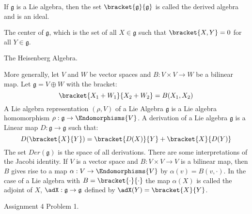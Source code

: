 \documentclass{book}                                                           %
\begin{document}
                \begin{example}
                    If $\mathfrak{g}$ is a Lie algebra, then the set
                    $\bracket{\mathfrak{g}}{\mathfrak{g}}$ is called the derived
                    algebra and is an ideal.
                \end{example}
                \begin{example}
                    The center of $\mathfrak{g}$, which is the set of all
                    $X\in\mathfrak{g}$ such that $\bracket{X,Y}=0$ for all
                    $Y\in\mathfrak{g}$.
                \end{example}
                \begin{example}
                    The Heisenberg Algebra.
                \end{example}
                More generally, let $V$ and $W$ be vector spaces and
                $B:V\times{V}\rightarrow{W}$ be a bilinear map. Let
                $\mathfrak{g}=V\oplus{W}$ with the bracket:
                \begin{equation}
                    \bracket{X_{1}+W_{1}}{X_{2}+W_{2}}=B(X_{1},X_{2})
                \end{equation}
                A Lie algebra representation $(\rho,V)$ of a Lie Algebra
                $\mathfrak{g}$ is a Lie algebra homomorphism
                $\rho:\mathfrak{g}\rightarrow\Endomorphisms{V}$. A derivation of
                a Lie algebra $\mathfrak{g}$ is a Linear map
                $D:\mathfrak{g}\rightarrow\mathfrak{g}$ such that:
                \begin{equation}
                    D(\bracket{X}{Y})=\bracket{D(X)}{Y}+\bracket{X}{D(Y)}
                \end{equation}
                The set $Der(\mathfrak{g})$ is the space of all derivations.
                There are some interpretations of the Jacobi identity. If $V$ is
                a vector space and $B:V\times{V}\rightarrow{V}$ is a bilinear
                map, then $B$ gives rise to a map
                $\alpha:V\rightarrow\Endomorphisms{V}$ by
                $\alpha(v)=B(v,\cdot)$. In the case of a Lie algebra with
                $B=\bracket{\cdot}{\cdot}$ the map $\alpha(X)$ is called the
                adjoint of $X$, $\adX:\mathfrak{g}\rightarrow\mathfrak{g}$
                defined by $\adX(Y)=\bracket{X}{Y}$.
                \begin{problem}
                    Assignment 4 Problem 1.
                \end{problem}
\end{document}
